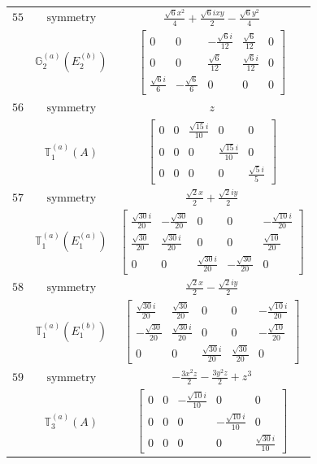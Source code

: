 \documentclass[fleqn,8pt,landscape]{jsarticle}
\begin{document}
\begin{longtable}{ccc}
$ 55 $ & $ \text{symmetry} $ & $ \frac{\sqrt{6} x^{2}}{4} + \frac{\sqrt{6} i x y}{2} - \frac{\sqrt{6} y^{2}}{4} $ \\
$  $ & $ \mathbb{G}_{2}^{(a)}(E_{2}^{(b)}) $ & $ \begin{bmatrix} 0 & 0 & - \frac{\sqrt{6} i}{12} & \frac{\sqrt{6}}{12} & 0 \\ 0 & 0 & \frac{\sqrt{6}}{12} & \frac{\sqrt{6} i}{12} & 0 \\ \frac{\sqrt{6} i}{6} & - \frac{\sqrt{6}}{6} & 0 & 0 & 0 \end{bmatrix} $ \\ \hline
$ 56 $ & $ \text{symmetry} $ & $ z $ \\
$  $ & $ \mathbb{T}_{1}^{(a)}(A) $ & $ \begin{bmatrix} 0 & 0 & \frac{\sqrt{15} i}{10} & 0 & 0 \\ 0 & 0 & 0 & \frac{\sqrt{15} i}{10} & 0 \\ 0 & 0 & 0 & 0 & \frac{\sqrt{5} i}{5} \end{bmatrix} $ \\ \hline
$ 57 $ & $ \text{symmetry} $ & $ \frac{\sqrt{2} x}{2} + \frac{\sqrt{2} i y}{2} $ \\
$  $ & $ \mathbb{T}_{1}^{(a)}(E_{1}^{(a)}) $ & $ \begin{bmatrix} \frac{\sqrt{30} i}{20} & - \frac{\sqrt{30}}{20} & 0 & 0 & - \frac{\sqrt{10} i}{20} \\ \frac{\sqrt{30}}{20} & \frac{\sqrt{30} i}{20} & 0 & 0 & \frac{\sqrt{10}}{20} \\ 0 & 0 & \frac{\sqrt{30} i}{20} & - \frac{\sqrt{30}}{20} & 0 \end{bmatrix} $ \\ \hline
$ 58 $ & $ \text{symmetry} $ & $ \frac{\sqrt{2} x}{2} - \frac{\sqrt{2} i y}{2} $ \\
$  $ & $ \mathbb{T}_{1}^{(a)}(E_{1}^{(b)}) $ & $ \begin{bmatrix} \frac{\sqrt{30} i}{20} & \frac{\sqrt{30}}{20} & 0 & 0 & - \frac{\sqrt{10} i}{20} \\ - \frac{\sqrt{30}}{20} & \frac{\sqrt{30} i}{20} & 0 & 0 & - \frac{\sqrt{10}}{20} \\ 0 & 0 & \frac{\sqrt{30} i}{20} & \frac{\sqrt{30}}{20} & 0 \end{bmatrix} $ \\ \hline
$ 59 $ & $ \text{symmetry} $ & $ - \frac{3 x^{2} z}{2} - \frac{3 y^{2} z}{2} + z^{3} $ \\
$  $ & $ \mathbb{T}_{3}^{(a)}(A) $ & $ \begin{bmatrix} 0 & 0 & - \frac{\sqrt{10} i}{10} & 0 & 0 \\ 0 & 0 & 0 & - \frac{\sqrt{10} i}{10} & 0 \\ 0 & 0 & 0 & 0 & \frac{\sqrt{30} i}{10} \end{bmatrix} $ \\ \hline

\end{longtable}
\end{document}
